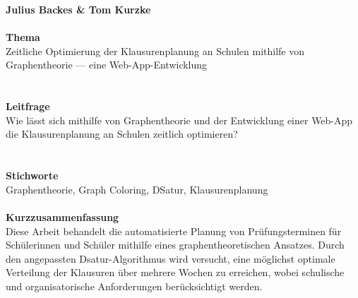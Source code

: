 \thispagestyle{plain}
\newpage
\noindent\textbf{Julius Backes \& Tom Kurzke}\\\\
\textbf{Thema}\\
Zeitliche Optimierung der
Klausurenplanung an Schulen
mithilfe von Graphentheorie — eine
Web-App-Entwicklung\\\\\\
\textbf{Leitfrage}\\
Wie lässt sich mithilfe von Graphentheorie und der Entwicklung einer Web-App die Klausurenplanung an Schulen zeitlich optimieren?\\\\\\
\textbf{Stichworte}\\
Graphentheorie, Graph Coloring, DSatur, Klausurenplanung\\\\
\textbf{Kurzzusammenfassung}\\
Diese Arbeit behandelt die automatisierte Planung von Prüfungsterminen für Schülerinnen und Schüler mithilfe eines graphentheoretischen Ansatzes. Durch den angepassten Dsatur-Algorithmus wird versucht, eine möglichst optimale Verteilung der Klausuren über mehrere Wochen zu erreichen, wobei schulische und organisatorische Anforderungen berücksichtigt werden.
